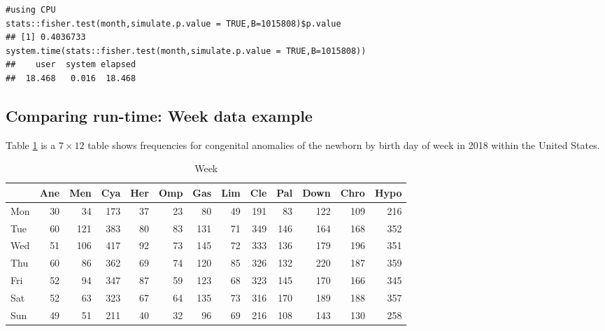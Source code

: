 \documentclass[article,nojss]{jss}\usepackage[]{graphicx}\usepackage[]{color}
\makeatletter
\newenvironment{kframe}{%
 \def\at@end@of@kframe{}%
 \ifinner\ifhmode%
  \def\at@end@of@kframe{\end{minipage}}%
  \begin{minipage}{\columnwidth}%
 \fi\fi%
 \def\FrameCommand##1{\hskip\@totalleftmargin \hskip-\fboxsep
 \colorbox{shadecolor}{##1}\hskip-\fboxsep
     \hskip-\linewidth \hskip-\@totalleftmargin \hskip\columnwidth}%
 \MakeFramed {\advance\hsize-\width
   \@totalleftmargin\z@ \linewidth\hsize
   \@setminipage}}%
 {\par\unskip\endMakeFramed%
 \at@end@of@kframe}
\newenvironment{knitrout}{}{} %
\makeatother
\begin{document}
 
\begin{knitrout}
\color{fgcolor}\begin{kframe}
\begin{verbatim}
#using CPU
stats::fisher.test(month,simulate.p.value = TRUE,B=1015808)$p.value
## [1] 0.4036733
system.time(stats::fisher.test(month,simulate.p.value = TRUE,B=1015808))
##    user  system elapsed 
##  18.468   0.016  18.468
\end{verbatim}
\end{kframe}
\end{knitrout}



\subsection{Comparing run-time: Week data example}\label{fisher_week}
Table \ref{tab:week} is a $7 \times 12$ table shows frequencies for congenital anomalies of the newborn by birth day of week in 2018 within the United States. 


\begin{knitrout}
\color{fgcolor}\begin{table}[H]

\caption{\label{tab:weekdata}Week\label{tab:week}}
\centering
\begin{tabular}[t]{lrrrrrrrrrrrr}
\toprule
  & Ane & Men & Cya & Her & Omp & Gas & Lim & Cle & Pal & Down & Chro & Hypo\\
\midrule
Mon & 30 & 34 & 173 & 37 & 23 & 80 & 49 & 191 & 83 & 122 & 109 & 216\\
Tue & 60 & 121 & 383 & 80 & 83 & 131 & 71 & 349 & 146 & 164 & 168 & 352\\
Wed & 51 & 106 & 417 & 92 & 73 & 145 & 72 & 333 & 136 & 179 & 196 & 351\\
Thu & 60 & 86 & 362 & 69 & 74 & 120 & 85 & 326 & 132 & 220 & 187 & 359\\
Fri & 52 & 94 & 347 & 87 & 59 & 123 & 68 & 323 & 145 & 170 & 166 & 345\\
Sat & 52 & 63 & 323 & 67 & 64 & 135 & 73 & 316 & 170 & 189 & 188 & 357\\
Sun & 49 & 51 & 211 & 40 & 32 & 96 & 69 & 216 & 108 & 143 & 130 & 258\\
\bottomrule
\end{tabular}
\end{table}

\end{knitrout}
\end{document}
